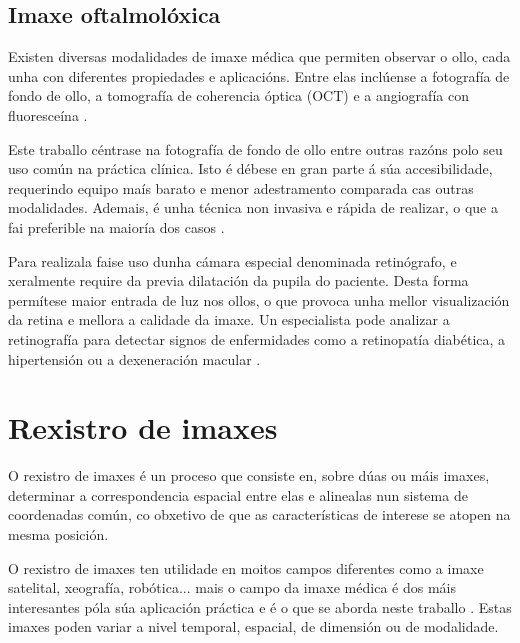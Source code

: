 \subsection{Imaxe oftalmolóxica}
\label{subsec:Imaxe oftalmolóxica}
Existen diversas modalidades de imaxe médica que permiten observar o ollo, cada unha con diferentes propiedades e aplicacións. 
Entre elas inclúense a fotografía de fondo de ollo, a tomografía de coherencia óptica (OCT) e a angiografía con fluoresceína \cite{ilginis2014ophthalmic}.

Este traballo céntrase na fotografía de fondo de ollo entre outras razóns polo seu uso común na práctica clínica.
Isto é débese en gran parte á súa accesibilidade, requerindo equipo maís barato e menor adestramento comparada cas outras modalidades. 
Ademais, é unha técnica non invasiva e rápida de realizar, o que a fai preferible na maioría dos casos \cite{retinimaging}.

Para realizala faise uso dunha cámara especial denominada retinógrafo, e xeralmente require da previa dilatación da pupila do paciente.
Desta forma permítese maior entrada de luz nos ollos, o que provoca unha mellor visualización da retina e mellora a calidade da imaxe.
Un especialista pode analizar a retinografía para detectar signos de enfermidades como a retinopatía diabética, a hipertensión ou a dexeneración macular \cite{retreggood}.

\section{Rexistro de imaxes}
\label{sec:Rexistro de imaxes}
O rexistro de imaxes é un proceso que consiste en, sobre dúas ou máis imaxes, determinar a correspondencia espacial entre elas
 e alinealas nun sistema de coordenadas común, co obxetivo de que as características de interese se atopen na mesma posición.


O rexistro de imaxes ten utilidade en moitos campos diferentes como a imaxe satelital, xeografía, robótica... mais o 
campo da imaxe médica é dos máis interesantes póla súa aplicación práctica e é o que se aborda neste traballo \cite{goshtasby2017theory}.
Estas imaxes poden variar a nivel temporal, espacial, de dimensión ou de modalidade.

